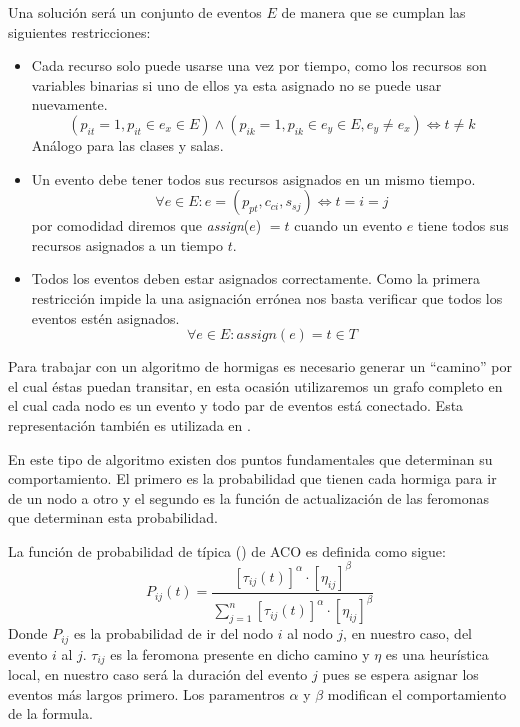 \documentclass[letter, 10pt]{article}
\renewcommand{\it}[1]{\textit{#1}}
\begin{document}
Una solución será un conjunto de eventos $E$ de manera que se cumplan las
siguientes restricciones:
\begin{itemize}
  \item
    Cada recurso solo puede usarse una vez por tiempo, como los recursos son
    variables binarias si uno de ellos ya esta asignado no se puede usar
    nuevamente.
    $$ (p_{it}=1, p_{it}\in e_x \in E) \land (p_{ik}=1, p_{ik}\in e_y \in E,
    e_y \neq e_x) \iff t \neq k $$
    Análogo para las clases y salas.
  \item
    Un evento debe tener todos sus recursos asignados en un mismo tiempo.
    $$ \forall e \in E : e = (p_{pt}, c_{ci}, s_{sj}) \iff t = i = j $$
    por comodidad diremos que \it{assign}($e$) $= t$ cuando un evento $e$ tiene
    todos sus recursos asignados a un tiempo $t$.
  \item
    Todos los eventos deben estar asignados correctamente. Como la primera
    restricción impide la una asignación errónea nos basta verificar que todos
    los eventos estén asignados.
    $$ \forall e \in E : \it{assign}(e) = t \in T$$
\end{itemize}

Para trabajar con un algoritmo de hormigas es necesario generar un ``camino''
por el cual éstas puedan transitar, en esta ocasión utilizaremos un grafo
completo en el cual cada nodo es un evento y todo par de eventos está conectado.
Esta representación también es utilizada en \cite{socha2002max}.

En este tipo de algoritmo existen dos puntos fundamentales que determinan su
comportamiento. El primero es la probabilidad que tienen cada hormiga para ir de
un nodo a otro y el segundo es la función de actualización de las feromonas que
determinan esta probabilidad.

La función de probabilidad de típica (\cite{colorni1991distributed}) de ACO es
definida como sigue:
\begin{equation} \label{eq:prob}
  P_{ij}(t) = \frac{ [\tau_{ij}(t)]^{\alpha}\cdot [\eta_{ij}]^{\beta} }
  { \sum_{j=1}^{n} [\tau_{ij}(t)]^{\alpha}\cdot [\eta_{ij}]^{\beta} }
\end{equation}
Donde $P_{ij}$ es la probabilidad de ir del nodo $i$ al nodo $j$, en nuestro
caso, del evento $i$ al $j$. $\tau_{ij}$ es la feromona presente en dicho camino
y $\eta$ es una heurística local, en nuestro caso será la duración del evento
$j$ pues se espera asignar los eventos más largos primero. Los paramentros
$\alpha$ y $\beta$ modifican el comportamiento de la formula.
\end{document}
